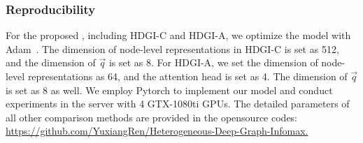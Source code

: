 \documentclass[conference]{IEEEtran}
\begin{document}
	
	\subsubsection{Reproducibility}
	For the proposed {\our}, including HDGI-C and HDGI-A, we optimize the model with Adam~\cite{KB15}. The dimension of node-level representations in HDGI-C is set as 512, and the dimension of $\vec{q}$ is set as 8. For HDGI-A, we set the dimension of node-level representations as 64, and the attention head is set as 4. The dimension of $\vec{q}$ is set as 8 as well. We employ Pytorch to implement our model and conduct experiments in the server with 4 GTX-1080ti GPUs. The detailed parameters of all other comparison methods are provided in the opensource codes:
	\href{https://github.com/YuxiangRen/Heterogeneous-Deep-Graph-Infomax}{https://github.com/YuxiangRen/Heterogeneous-Deep-Graph-Infomax.}  
	
\end{document}

